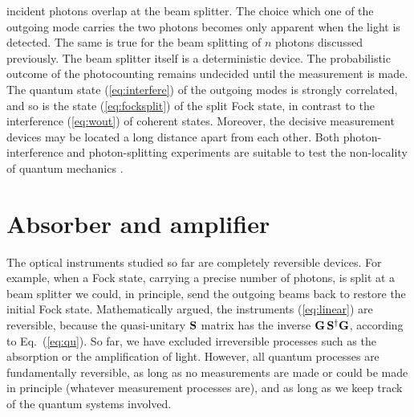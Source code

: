 \documentclass[12pt,amsmath,amssymb]{article}
\def\underline#1{{\bf #1}}
\numberwithin{equation}{section}
\begin{document}
incident photons overlap at the beam splitter. The choice which
one of the outgoing mode carries the two photons becomes only
apparent when the light is detected. The same is true for the beam
splitting of $n$ photons discussed previously. The beam splitter
itself is a deterministic device. The probabilistic outcome of the
photocounting remains undecided until the measurement is made.
The quantum state (\ref{eq:interfere}) of the outgoing modes is
strongly correlated, and so is the state (\ref{eq:focksplit}) of
the split Fock state, in contrast to the interference
(\ref{eq:wout}) of coherent states. Moreover, the decisive
measurement devices may be located a long distance apart from
each other. Both photon-interference and photon-splitting
experiments are suitable \cite{Tan,Hardy} to test the
non-locality of quantum mechanics \cite{Bell,EPR}.

\section{Absorber and amplifier}

The optical instruments studied so far are completely reversible
devices. For example, when a Fock state, carrying a precise
number of photons, is split at a beam splitter we could, in
principle, send the outgoing beams back to restore the initial
Fock state. Mathematically argued, the instruments
(\ref{eq:linear}) are reversible, because the quasi-unitary
$\underline{S}$ matrix has the inverse
$\underline{G}\,\underline{S}^\dagger \underline{G}$, according
to Eq.\ (\ref{eq:qu}). So far, we have excluded irreversible
processes such as the absorption or the amplification of light.
However, all quantum processes are fundamentally
reversible, as long as no measurements are made or could be made
in principle (whatever measurement processes are), and as long as
we keep track of the quantum systems involved.
\end{document}
